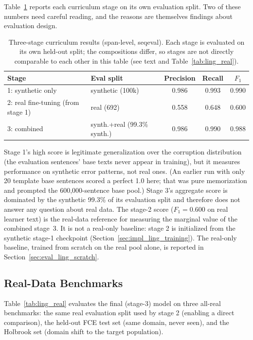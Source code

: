 Table~\ref{tab:ling_stages} reports each curriculum stage on its own evaluation split. Two of these numbers need careful reading, and the reasons are themselves findings about evaluation design.

\begin{table}[h]
\centering
\caption[Three-stage curriculum results (span-level, seqeval).]{Three-stage curriculum results (span-level, seqeval). Each stage is evaluated on its own held-out split; the compositions differ, so stages are not directly comparable to each other in this table (see text and Table~\ref{tab:ling_real}).}
\label{tab:ling_stages}
\small\setlength{\tabcolsep}{4pt}
\begin{tabular}{llccc}
\toprule
\textbf{Stage} & \textbf{Eval split} & \textbf{Precision} & \textbf{Recall} & \textbf{$F_1$} \\
\midrule
1: synthetic only & synthetic (100k) & 0.986 & 0.993 & 0.990 \\
2: real fine-tuning (from stage 1) & real (692) & 0.558 & 0.648 & 0.600 \\
3: combined & synth.+real (99.3\% synth.) & 0.986 & 0.990 & 0.988 \\
\bottomrule
\end{tabular}
\end{table}

Stage 1's high score is legitimate generalization over the corruption distribution (the evaluation sentences' base texts never appear in training), but it measures performance on synthetic error patterns, not real ones. (An earlier run with only 20 template base sentences scored a perfect 1.0 here; that was pure memorization and prompted the 600{,}000-sentence base pool.) Stage 3's aggregate score is dominated by the synthetic 99.3\% of its evaluation split and therefore does not answer any question about real data. The stage-2 score ($F_1 = 0.600$ on real learner text) is the real-data reference for measuring the marginal value of the combined stage~3. It is not a real-only baseline: stage 2 is initialized from the synthetic stage-1 checkpoint (Section~\ref{sec:impl_ling_training}). The real-only baseline, trained from scratch on the real pool alone, is reported in Section~\ref{sec:eval_ling_scratch}.

\subsection{Real-Data Benchmarks}
\label{sec:eval_ling_real}

Table~\ref{tab:ling_real} evaluates the final (stage-3) model on three all-real benchmarks: the same real evaluation split used by stage 2 (enabling a direct comparison), the held-out FCE test set (same domain, never seen), and the Holbrook set (domain shift to the target population).

